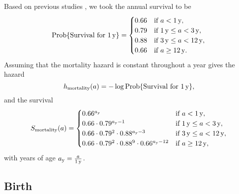 \documentclass[12pt, USenglish]{article}  %
\DeclareMathOperator{\Prob}{Prob}
\begin{document}
Based on previous studies \autocites{cross_2009}{gorsich_2018}, we
took the annual survival to be
\begin{equation}
  \Prob\{\text{Survival for $\unit[1]{y}$}\}
  =
  \begin{cases}
    0.66 & \text{if $a < \unit[1]{y}$},
    \\
    0.79 & \text{if $\unit[1]{y} \leq a < \unit[3]{y}$},
    \\
    0.88 & \text{if $\unit[3]{y} \leq a < \unit[12]{y}$},
    \\
    0.66 & \text{if $a \geq \unit[12]{y}$}.
  \end{cases}
\end{equation}
Assuming that the mortality hazard is constant throughout a year gives
the hazard
\begin{equation}
  h_{\text{mortality}}(a)
  = - \log \Prob\{\text{Survival for $\unit[1]{y}$}\},
\end{equation}
and the survival
\begin{equation}
  \begin{split}
    S_{\text{mortality}}(a)
    =
    \begin{cases}
      0.66^{a_{\mathrm{y}}}
      & \text{if $a < \unit[1]{y}$},
      \\
      0.66 \cdot 0.79^{a_{\mathrm{y}} - 1}
      & \text{if $\unit[1]{y} \leq a < \unit[3]{y}$},
      \\
      0.66 \cdot 0.79^2 \cdot 0.88^{a_{\mathrm{y}} - 3}
      & \text{if $\unit[3]{y} \leq a < \unit[12]{y}$},
      \\
      0.66 \cdot 0.79^2 \cdot 0.88^9 \cdot 0.66^{a_{\mathrm{y}} - 12}
      & \text{if $a \geq \unit[12]{y}$},
    \end{cases}
  \end{split}
\end{equation}
with years of age $a_{\mathrm{y}} = \frac{a}{\unit[1]{y}}$.

\subsection{Birth}
\end{document}
